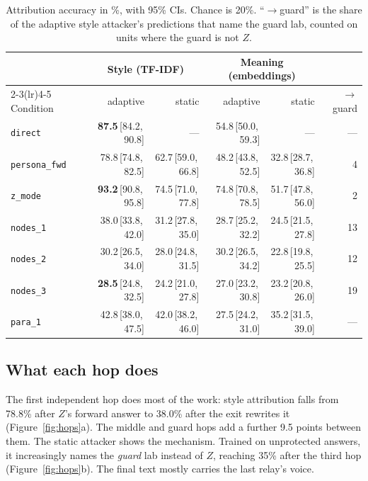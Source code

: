 \documentclass[11pt]{article}
\newcommand{\cond}[1]{\texttt{#1}}
\newcommand{\ci}[2]{\,[#1,\,#2]}
\begin{document}
\begin{table}[t]
\centering
\small
\begin{tabular}{@{}l rrrr r@{}}
\toprule
 & \multicolumn{2}{c}{Style (TF-IDF)} & \multicolumn{2}{c}{Meaning (embeddings)} & \\
\cmidrule(lr){2-3}\cmidrule(lr){4-5}
Condition & adaptive & static & adaptive & static & $\to$guard \\
\midrule
\cond{direct}      & \textbf{87.5}\ci{84.2}{90.8} & --- & 54.8\ci{50.0}{59.3} & --- & --- \\
\cond{persona\_fwd} & 78.8\ci{74.8}{82.5} & 62.7\ci{59.0}{66.8} & 48.2\ci{43.8}{52.5} & 32.8\ci{28.7}{36.8} & 4 \\
\cond{z\_mode}      & \textbf{93.2}\ci{90.8}{95.8} & 74.5\ci{71.0}{77.8} & 74.8\ci{70.8}{78.5} & 51.7\ci{47.8}{56.0} & 2 \\
\cond{nodes\_1}     & 38.0\ci{33.8}{42.0} & 31.2\ci{27.8}{35.0} & 28.7\ci{25.2}{32.2} & 24.5\ci{21.5}{27.8} & 13 \\
\cond{nodes\_2}     & 30.2\ci{26.5}{34.0} & 28.0\ci{24.8}{31.5} & 30.2\ci{26.5}{34.2} & 22.8\ci{19.8}{25.5} & 12 \\
\cond{nodes\_3}     & \textbf{28.5}\ci{24.8}{32.5} & 24.2\ci{21.0}{27.8} & 27.0\ci{23.2}{30.8} & 23.2\ci{20.8}{26.0} & 19 \\
\cond{para\_1}      & 42.8\ci{38.0}{47.5} & 42.0\ci{38.2}{46.0} & 27.5\ci{24.2}{31.0} & 35.2\ci{31.5}{39.0} & --- \\
\bottomrule
\end{tabular}
\caption{Attribution accuracy in \%, with 95\% CIs. Chance is 20\%. ``$\to$guard'' is the share of the adaptive style attacker's predictions that name the guard lab, counted on units where the guard is not $Z$.}
\label{tab:accuracy}
\end{table}

\subsection{What each hop does}

The first independent hop does most of the work: style attribution falls from 78.8\% after $Z$'s forward answer to 38.0\% after the exit rewrites it (Figure~\ref{fig:hops}a). The middle and guard hops add a further 9.5 points between them. The static attacker shows the mechanism. Trained on unprotected answers, it increasingly names the \emph{guard} lab instead of $Z$, reaching 35\% after the third hop (Figure~\ref{fig:hops}b). The final text mostly carries the last relay's voice.
\end{document}
